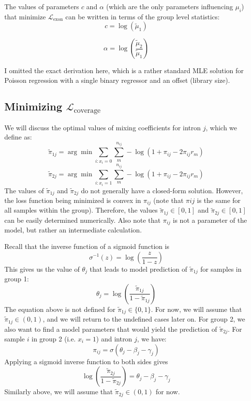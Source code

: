 \documentclass{article}
\begin{document}
	The values of parameters $c$ and $\alpha$ (which are the only parameters influencing $\mu_i$) that minimize $\mathcal{L}_{\text{exon}}$ can be written in terms of the group level statistics:
	$$
	c = \log \left( \tilde{\mu}_1 \right)
	$$
	
	$$
	\alpha = \log \left( \frac{\tilde{\mu}_2}{\tilde{\mu}_1}  \right)
	$$
	
	I omitted the exact derivation here, which is a rather standard MLE solution for Poisson regression with a single binary regressor and an offset (library size).	
	
	
	\subsection{Minimizing $\mathcal{L}_{\text{coverage}}$}
	We will discuss the optimal values of mixing coefficients for intron $j$, which we define as:
	$$
	\tilde{\pi}_{1j} = \arg \min \sum_{i: x_i=0}  \sum_{m}^{n_{ij}} -\log \left( 
	1+\pi_{ij}-2\pi_{ij}r_m \right)
	$$
	$$
	\tilde{\pi}_{2j} = \arg \min \sum_{i: x_i=1}  \sum_{m}^{n_{ij}} -\log \left( 
	1+\pi_{ij}-2\pi_{ij}r_m \right)
	$$
	The values of $\tilde{\pi}_{1j}$ and $\tilde{\pi}_{2j}$  do not generally have a closed-form solution. However, the loss function being minimized is convex in $\pi_{ij}$ (note that $\pi{ij}$ is the same for all samples within the group). Therefore, the values $\tilde{\pi}_{1j} \in [0, 1]$ and $\tilde{\pi}_{2j} \in [0, 1]$ can be easily determined numerically.
	Also note that $\pi_{ij}$ is not a parameter of the model, but rather an intermediate calculation.
	
	Recall that the inverse function of a sigmoid function is
	$$
	\sigma^{-1}(z) = \log \left( \frac{z}{1-z}\right)
	$$	
	This gives us the value of $\theta_j$ that leads to model prediction of $\tilde{\pi}_{1j}$ for samples in group 1:
	$$
	\theta_j = \log \left( \frac{\tilde{\pi}_{1j}}{1-\tilde{\pi}_{1j}}\right)
	$$
	The equation above is not defined for $\tilde{\pi}_{1j} \in \{ 0,1\}$. For now, we will assume that $\tilde{\pi}_{1j} \in (0,1)$, and we will return to the undefined cases later on.
	For group 2, we also want to find a model parameters that would yield the prediction of $\tilde{\pi}_{2j}$. For sample $i$ in group 2 (i.e. $x_i=1$) and intron $j$, we have:
	$$	
	\pi_{ij} = \sigma \left( \theta_j - \beta_j - \gamma_j \right) 
	$$
	Applying a sigmoid inverse function to both sides gives
	$$
	\log \left( \frac{\tilde{\pi}_{2j}}{1-\tilde{\pi}_{2j}}\right) = \theta_j - \beta_j - \gamma_j
	$$	
	Similarly above, we will assume that $\tilde{\pi}_{2j} \in (0,1)$ for now.
	
\end{document}
